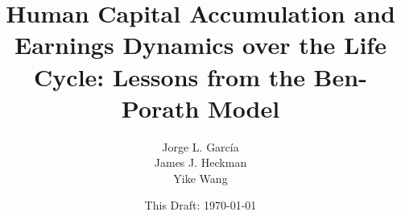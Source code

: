 \documentclass[12pt]{article}
\begin{document}
\title{Human Capital Accumulation and Earnings Dynamics over the Life Cycle: Lessons from the Ben-Porath Model}
\author{Jorge L. Garc\'{i}a \\ James J. Heckman \\ Yike Wang}
\date{This Draft: \today}
\maketitle
\clearpage





\clearpage


\end{document}
